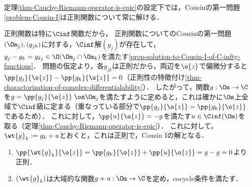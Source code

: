 \documentclass[uplatex, dvipdfmx]{jsreport}
\begin{document}
\begin{lemma}[Cousinの第一問題の定理への還元への成功]
    定理\ref{thm-Cauchy-Riemann-operator-is-epic}の設定下では，Cousinの第一問題\ref{problem-Cousin-I}は正則関数について常に解ける．
\end{lemma}
\begin{Proof}
    正則関数は特に$\Cinf$関数だから，
    正則関数についてのCousinの第一問題$(\Om_j),(g_{jk})$に対する，$\Cinf$解$(g_j)$が存在して，$g_j-g_k=g_{kj}\in\O(\Om_j\cap\Om_k)$を満たす\ref{prop-solution-to-Cousin-I-of-C-infty-functions}．
    問題の仮定より，各$g_{jk}$は正則だから，両辺を$\o{z}$で偏微分すると$\pp{g_j}{\o{z}}-\pp{g_k}{\o{z}}=0$（正則性の特徴付け\ref{thm-charactorization-of-complex-differentialability}）．
    したがって，関数$g:\Om\to\C$を$g=\pp{g_j}{\o{z}}\;\on\Om_j$を満たすように定めると，これは確かに$\Om$上全域で$\Cinf$級に定まる（重なっている部分で$\pp{g_j}{\o{z}}=\pp{g_k}{\o{z}}$であるため）．
    これに対して，$\pp{u}{\o{z}}=-g$を満たす$u\in\Cinf(\Om)$を取る（定理\ref{thm-Cauchy-Riemann-operator-is-epic}）．
    これに対して，$\wt{g}_k:=g_k+u$とおくと，これは正則で，Cousin Iの解となる．
    \begin{enumerate}
        \item $\pp{\wt{g}_k}{\o{z}}=\pp{g_k}{\o{z}}+\pp{u}{\o{z}}=g-g=0$より正則．
        \item $(\wt{g}_k)$は大域的な関数$g+u:\Om\to\C$を定め，cocycle条件を満たす．
    \end{enumerate}
\end{Proof}
\end{document}
